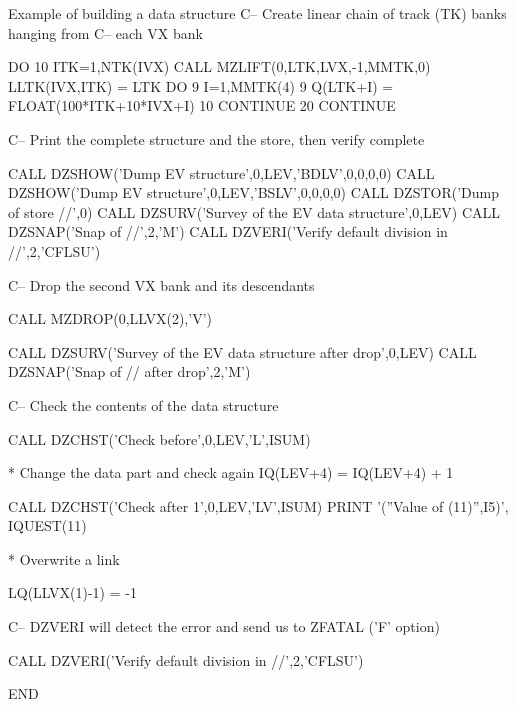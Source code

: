 \begin{XMPt}{Example of building a data structure}
C--       Create linear chain of track (TK) banks hanging from
C--              each VX bank
 
          DO 10 ITK=1,NTK(IVX)
              CALL MZLIFT(0,LTK,LVX,-1,MMTK,0)
              LLTK(IVX,ITK) = LTK
              DO 9 I=1,MMTK(4)
    9         Q(LTK+I) = FLOAT(100*ITK+10*IVX+I)
   10     CONTINUE
   20 CONTINUE
 
C--     Print the complete structure and the store, then verify complete
 
      CALL DZSHOW('Dump EV structure',0,LEV,'BDLV',0,0,0,0)
      CALL DZSHOW('Dump EV structure',0,LEV,'BSLV',0,0,0,0)
      CALL DZSTOR('Dump of store //',0)
      CALL DZSURV('Survey of the EV data structure',0,LEV)
      CALL DZSNAP('Snap of //',2,'M')
      CALL DZVERI('Verify default division in //',2,'CFLSU')

C--     Drop the second VX bank and its descendants

      CALL MZDROP(0,LLVX(2),'V')

      CALL DZSURV('Survey of the EV data structure after drop',0,LEV)
      CALL DZSNAP('Snap of // after drop',2,'M')

C--     Check the contents of the data structure

      CALL DZCHST('Check before',0,LEV,'L',ISUM)

*         Change the data part and check again
      IQ(LEV+4) = IQ(LEV+4) + 1  

      CALL DZCHST('Check after 1',0,LEV,'LV',ISUM)
      PRINT '(''Value of \IQUEST(11)'',I5)', IQUEST(11)
            
*         Overwrite a link 

      LQ(LLVX(1)-1) = -1

C--     DZVERI will detect the error and send us to ZFATAL ('F' option)

      CALL DZVERI('Verify default division in //',2,'CFLSU')

      END
\end{XMPt}

